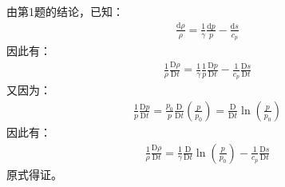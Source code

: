 \begin{enumerate}
        由第1题的结论，已知：
        \begin{gather}
            \frac{\mathrm{d} \rho}{\rho}=\frac{1}{\gamma} \frac{\mathrm{d} p}{p}-\frac{\mathrm{d} s}{c_{p}}
        \end{gather}
        因此有：
        \begin{gather}
            \frac{1}{\rho} \frac{\mathrm{D} \rho}{\mathrm{D} t}
            =\frac{1}{\gamma} \frac{1}{p} \frac{\mathrm{D} p}{\mathrm{D} t}-\frac{1}{c_{p}} \frac{\mathrm{D} s}{\mathrm{D} t}
        \end{gather}
        又因为：
        \begin{equation}
            \begin{aligned}
                \frac{1}{p} \frac{\mathrm{D} p}{\mathrm{D} t} 
                = \frac{p_{0}}{p} \frac{\mathrm{D}}{\mathrm{D} t} ( \frac{p}{p_{0}} )
                = \frac{\mathrm{D}}{\mathrm{D} t} \ln ( \frac{p}{p_{0}} )
            \end{aligned}
        \end{equation}
        因此有：
        \begin{gather}
            \frac{1}{\rho} \frac{\mathrm{D} \rho}{\mathrm{D} t}=\frac{1}{\gamma} \frac{\mathrm{D}}{\mathrm{D} t} \ln \left(\frac{p}{p_{0}}\right)-\frac{1}{c_{p}} \frac{\mathrm{D} s}{\mathrm{D} t}
        \end{gather}
        原式得证。
\end{enumerate}